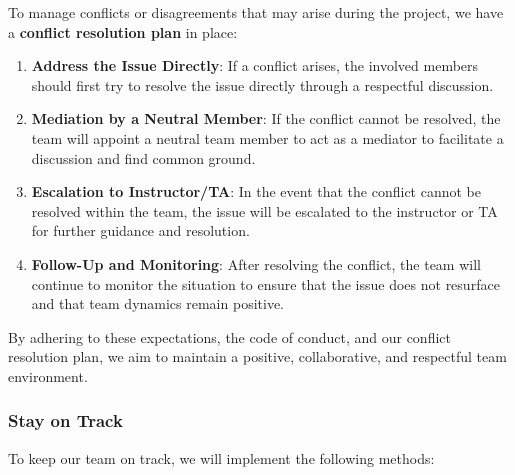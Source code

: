 \documentclass{article}
\begin{document}
\noindent
To manage conflicts or disagreements that may arise during the
project, we have a \textbf{conflict resolution plan} in place:

\begin{enumerate}
  \item \textbf{Address the Issue Directly}: If a conflict arises,
    the involved members should first try to resolve the issue
    directly through a respectful discussion.
  \item \textbf{Mediation by a Neutral Member}: If the conflict
    cannot be resolved, the team will appoint a neutral team member
    to act as a mediator to facilitate a discussion and find common ground.
  \item \textbf{Escalation to Instructor/TA}: In the event that the
    conflict cannot be resolved within the team, the issue will be
    escalated to the instructor or TA for further guidance and resolution.
  \item \textbf{Follow-Up and Monitoring}: After resolving the
    conflict, the team will continue to monitor the situation to
    ensure that the issue does not resurface and that team dynamics
    remain positive.
\end{enumerate}

By adhering to these expectations, the code of conduct, and our
conflict resolution plan, we aim to maintain a positive,
collaborative, and respectful team environment.

\subsubsection*{Stay on Track}


To keep our team on track, we will implement the following methods:
\end{document}

